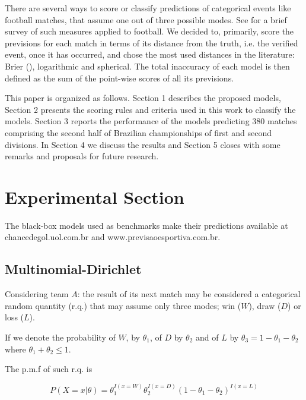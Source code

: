 \documentclass[journal,article,accept,moreauthors,pdftex,12pt,a4paper]{mdpi}
\begin{document}
There are several ways to score or classify predictions of categorical events like football matches, that assume one out of three possible modes.
See \cite{constantinou} for a brief survey of such measures applied to football.
We decided to, primarily, score the previsions for each match in terms of its distance from the truth, i.e. the verified event, once it has occurred, and chose the most used distances in the literature: Brier (\cite{brier1950}), logarithmic and spherical.
The total inaccuracy of each model is then defined as the sum of the point-wise scores of all its previsions.

This paper is organized as follows.
Section 1 describes the proposed models, Section 2 presents the scoring rules and criteria used in this work to classify the models.
Section 3 reports the performance of the models predicting 380 matches comprising the second half of Brazilian championships of first and second divisions.
In Section 4 we discuss the results and Section 5 closes with some remarks and proposals for future research.





\section{Experimental Section}

The black-box models used as benchmarks make their predictions available at {chancedegol.uol.com.br} and {www.previsaoesportiva.com.br}.


\subsection{Multinomial-Dirichlet}

Considering team $A$: the result of its next match may be considered a categorical random quantity (r.q.) that may assume only three modes; win ($W$), draw ($D$) or loss ($L$).

If we denote the probability of $W$, by $\theta_1$, of $D$ by $\theta_2$ and of $L$ by $\theta_3=1-\theta_1-\theta_2$ where $\theta_1+\theta_2\leq 1$.

The p.m.f of such r.q. is

\[
P(X=x|\theta)=\theta_1^{I(x=W)}\theta_2^{I(x=D)}(1-\theta_1-\theta_2)^{I(x=L)}
\]
\end{document}
